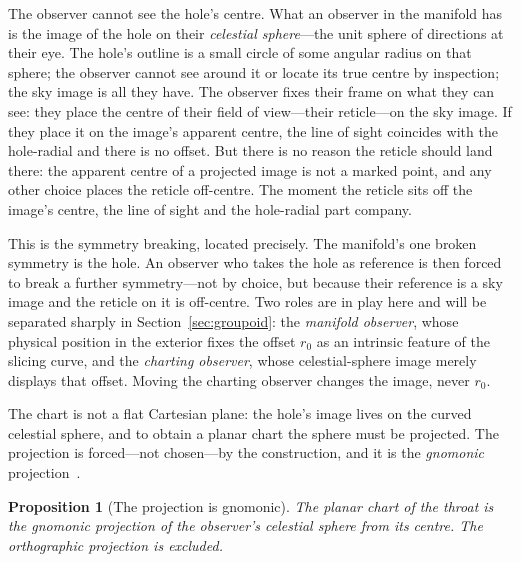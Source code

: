 \documentclass[11pt,a4paper]{article}
\newtheorem{proposition}[theorem]{Proposition}
\theoremstyle{definition}
\begin{document}
The observer cannot see the hole's centre. What an observer in the manifold has is the image of the hole on their \emph{celestial sphere}---the unit sphere of directions at their eye. The hole's outline is a small circle of some angular radius on that sphere; the observer cannot see around it or locate its true centre by inspection; the sky image is all they have. The observer fixes their frame on what they can see: they place the centre of their field of view---their reticle---on the sky image. If they place it on the image's apparent centre, the line of sight coincides with the hole-radial and there is no offset. But there is no reason the reticle should land there: the apparent centre of a projected image is not a marked point, and any other choice places the reticle off-centre. The moment the reticle sits off the image's centre, the line of sight and the hole-radial part company.

This is the symmetry breaking, located precisely. The manifold's one broken symmetry is the hole. An observer who takes the hole as reference is then forced to break a further symmetry---not by choice, but because their reference is a sky image and the reticle on it is off-centre. Two roles are in play here and will be separated sharply in Section~\ref{sec:groupoid}: the \emph{manifold observer}, whose physical position in the exterior fixes the offset $r_{0}$ as an intrinsic feature of the slicing curve, and the \emph{charting observer}, whose celestial-sphere image merely displays that offset. Moving the charting observer changes the image, never $r_{0}$.

The chart is not a flat Cartesian plane: the hole's image lives on the curved celestial sphere, and to obtain a planar chart the sphere must be projected. The projection is forced---not chosen---by the construction, and it is the \emph{gnomonic} projection~\cite{Snyder1987}.

\begin{proposition}[The projection is gnomonic]\label{prop:gnomonic}
The planar chart of the throat is the gnomonic projection of the observer's celestial sphere from its centre. The orthographic projection is excluded.
\end{proposition}
\end{document}
